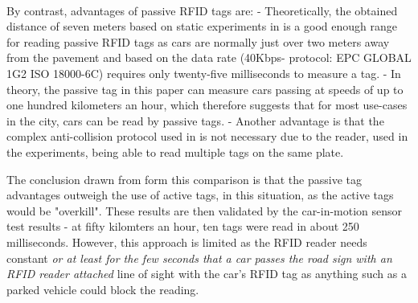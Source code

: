 \documentclass[12pt,a4paper]{article}
\begin{document}
\paragraph{}
By contrast, advantages of passive RFID tags are:
- Theoretically, the obtained distance of seven meters based on static experiments in \cite{GarciaOya2018} is a good enough range for reading passive RFID tags as cars are normally just over two meters away from the pavement and based on the data rate (40Kbps- protocol: EPC GLOBAL 1G2 ISO 18000-6C) requires only twenty-five milliseconds to measure a tag. 
- In theory, the passive tag in this paper can measure cars passing at speeds of up  to one hundred kilometers an hour, which therefore suggests that for most use-cases in the city, cars can be read by passive tags.
- Another advantage is that the complex anti-collision protocol used in \cite{GarciaOya2018} is not necessary due to the reader, used in the experiments, being able to read multiple tags on the same plate.

The conclusion drawn from form this comparison is that the passive tag advantages outweigh the use of active tags, in this situation, as the active tags would be "overkill". These results are then validated by the car-in-motion sensor test results - at fifty kilomters an hour, ten tags were read in about 250 milliseconds. However, this approach is limited as the RFID reader needs constant \textit{or at least for the few seconds that a car passes the road sign with an RFID reader attached} line of sight with the car's RFID tag as anything such as a parked vehicle could block the reading. \cite{GarciaOya2018} 

\newpage



\end{document}
